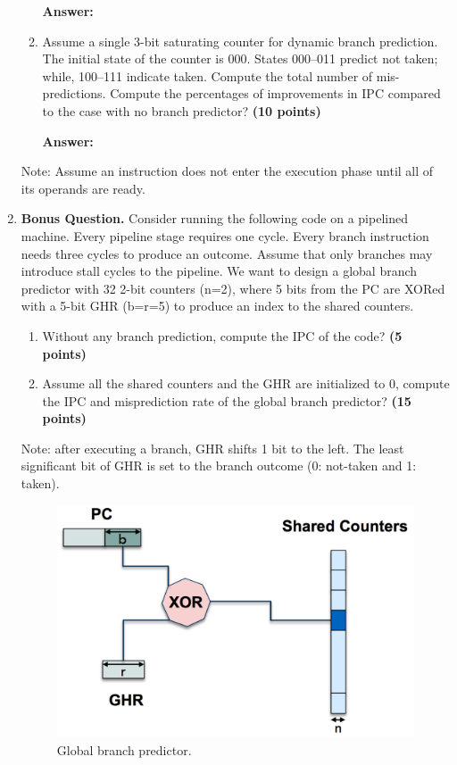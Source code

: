 \documentclass[a4paper, 11pt]{exam}
\begin{document}
\begin{center}
\begin{enumerate}
\begin{enumerate}
    \hfill
 
\textbf{Answer:} 

\hfill

   \item Assume a single 3-bit saturating counter for dynamic branch prediction. The initial state of the counter is 000. States 000--011 predict not taken; while, 100--111 indicate taken. Compute the total number of mis-predictions. Compute the percentages of improvements in IPC compared to the case with no branch predictor? \textbf {(10 points)}
   
   \hfill
 
\textbf{Answer:} 

\hfill

\end{enumerate}
Note: Assume an instruction does not enter the execution phase until all of its operands are ready.



\item \textbf{Bonus Question.}
Consider running the following code on a pipelined machine. Every pipeline stage requires one cycle. Every branch instruction needs three cycles to produce an outcome. Assume that only branches may introduce stall cycles to the pipeline.
We want to design a global branch predictor with 32 2-bit counters (n=2), where 5 bits from the PC are XORed with a 5-bit GHR (b=r=5) to produce an index to the shared counters.
\begin{enumerate}
	\item  Without any branch prediction, compute the IPC of the code? \textbf {(5 points)}
	\item  Assume all the shared counters and the GHR are initialized to 0, compute the IPC and misprediction rate of the global branch predictor? \textbf{(15 points)}
\end{enumerate}
Note: after executing a branch, GHR shifts 1 bit to the left. The least significant bit of GHR is set to the branch outcome (0: not-taken and 1: taken).

\begin{figure}[!h]
	\centering
	\includegraphics[width=0.5\linewidth]{q5}
	\caption{Global branch predictor.}
	\label{fig:q5}
\end{figure}



\end{enumerate}
\end{center}
\end{document}
